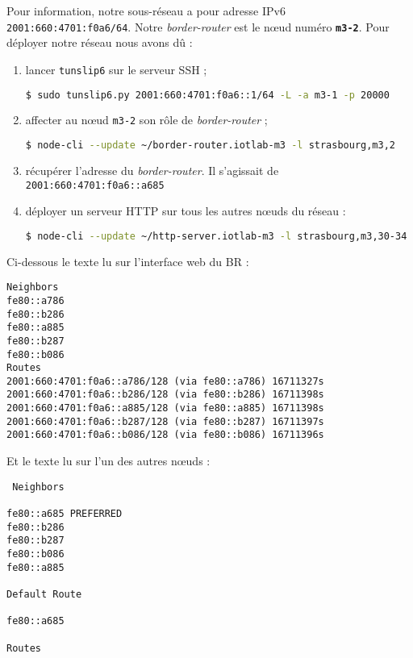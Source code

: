\documentclass[	DIV=calc,%
							paper=a4,%
							fontsize=11pt,%
			  ]{scrartcl}	 					%
\begin{document}

Pour information, notre sous-réseau a pour adresse IPv6 \texttt{2001:660:4701:f0a6/64}. Notre \textit{border-router} est le nœud numéro \textbf{\texttt{m3-2}}. Pour déployer notre réseau nous avons dû :
\begin{enumerate}
\item lancer \texttt{tunslip6} sur le serveur SSH ;
\begin{lstlisting}[language=bash]
$ sudo tunslip6.py 2001:660:4701:f0a6::1/64 -L -a m3-1 -p 20000
\end{lstlisting}
\item affecter au nœud \texttt{m3-2} son rôle de \textit{border-router} ;
\begin{lstlisting}[language=bash]
$ node-cli --update ~/border-router.iotlab-m3 -l strasbourg,m3,2
\end{lstlisting}
\item récupérer l'adresse du \textit{border-router}. Il s'agissait de \texttt{2001:660:4701:f0a6::a685}
\item déployer un serveur HTTP sur tous les autres nœuds du réseau :
\begin{lstlisting}[language=bash]
$ node-cli --update ~/http-server.iotlab-m3 -l strasbourg,m3,30-34
\end{lstlisting}
\end{enumerate}

Ci-dessous le texte lu sur l'interface web du BR :

\begin{lstlisting}
Neighbors
fe80::a786
fe80::b286
fe80::a885
fe80::b287
fe80::b086
Routes
2001:660:4701:f0a6::a786/128 (via fe80::a786) 16711327s
2001:660:4701:f0a6::b286/128 (via fe80::b286) 16711398s
2001:660:4701:f0a6::a885/128 (via fe80::a885) 16711398s
2001:660:4701:f0a6::b287/128 (via fe80::b287) 16711397s
2001:660:4701:f0a6::b086/128 (via fe80::b086) 16711396s
\end{lstlisting}

Et le texte lu sur l'un des autres nœuds :

\begin{lstlisting}
 Neighbors

fe80::a685 PREFERRED
fe80::b286
fe80::b287
fe80::b086
fe80::a885

Default Route

fe80::a685

Routes
\end{lstlisting}
\end{document}
